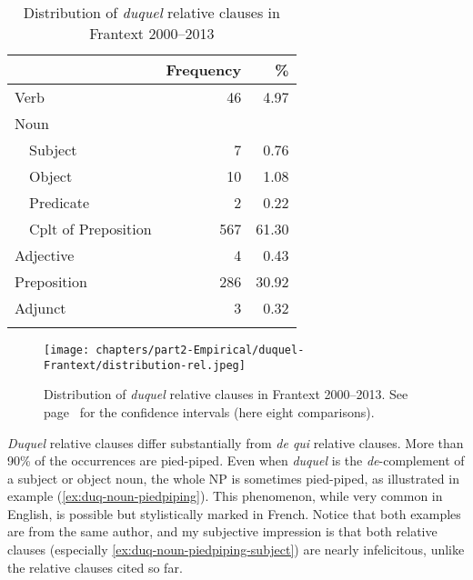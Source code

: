 \begin{table}[ht]
\centering
    \begin{tabular}{llrr}
         \lsptoprule
         & & Frequency & \% \\\midrule
         \multicolumn{2}{l}{Verb} & 46 & 4.97 \\
         \multicolumn{2}{l}{Noun} & & \\
                                  & Subject & 7 & 0.76 \\
                                  & Object & 10 & 1.08 \\
                                  & Predicate & 2 & 0.22 \\
                                  & Cplt of Preposition & 567 & 61.30 \\
         \multicolumn{2}{l}{Adjective}                  & 4 & 0.43 \\
         \multicolumn{2}{l}{Preposition}                & 286 & 30.92 \\
         \multicolumn{2}{l}{Adjunct}                    & 3 & 0.32 \\
         \lspbottomrule
    \end{tabular}
    \caption{Distribution of \emph{duquel} relative clauses in Frantext 2000--2013}
    \label{tab:duq}
\end{table}

\begin{figure}
    \centering
    \texttt{[image: chapters/part2-Empirical/duquel-Frantext/distribution-rel.jpeg]}
    \caption[Distribution of \emph{duquel} relative clauses in Frantext 2000--2013]{Distribution of \emph{duquel} relative clauses in Frantext 2000--2013. See page~\pageref{ch:conf-intervals-binomial} for the confidence intervals (here eight comparisons).}
    \label{fig:duq}
\end{figure}

\emph{Duquel} relative clauses differ substantially from \emph{de qui} relative clauses. More than 90\% of the occurrences are pied-piped. Even when \emph{duquel} is the \emph{de}-complement of a subject or object noun, the whole NP is sometimes pied-piped, as illustrated in example (\ref{ex:duq-noun-piedpiping}). This phenomenon, while very common in English, is possible but stylistically marked in French. Notice that both examples are from the same author, and my subjective impression is that both relative clauses (especially \ref{ex:duq-noun-piedpiping-subject}) are nearly infelicitous, unlike the relative clauses cited so far. 

